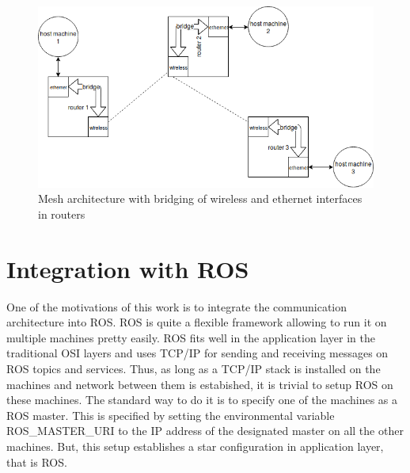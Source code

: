 \begin{figure}[h]
	\centering
	\includegraphics[scale=0.7]{Pictures/meshNetwork.png}
	\caption{Mesh architecture with bridging of wireless and ethernet interfaces in routers}
	\label{fig: meshNetwork}
\end{figure}

\section{Integration with ROS}
One of the motivations of this work is to integrate the communication architecture into ROS. ROS is quite a flexible framework allowing to run it on multiple machines pretty easily. ROS fits well in the application layer in the traditional OSI layers and uses TCP/IP for sending and receiving messages on ROS topics and services. Thus, as long as a TCP/IP stack is installed on the machines and network between them is estabished, it is trivial to setup ROS on these machines. The standard way to do it is to specify one of the machines as a ROS master. This is specified by setting the environmental variable ROS_MASTER_URI to the IP address of the designated master on all the other machines. But, this setup establishes a star configuration in application layer, that is ROS. 






